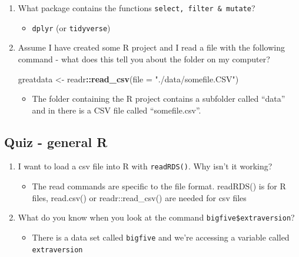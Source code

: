 \documentclass[
]{book}
\newenvironment{Shaded}{\begin{snugshade}}{\end{snugshade}}
\newcommand{\AttributeTok}[1]{\textcolor[rgb]{0.13,0.29,0.53}{#1}}
\newcommand{\FunctionTok}[1]{\textcolor[rgb]{0.13,0.29,0.53}{\textbf{#1}}}
\newcommand{\NormalTok}[1]{#1}
\newcommand{\OtherTok}[1]{\textcolor[rgb]{0.56,0.35,0.01}{#1}}
\newcommand{\SpecialCharTok}[1]{\textcolor[rgb]{0.81,0.36,0.00}{\textbf{#1}}}
\newcommand{\StringTok}[1]{\textcolor[rgb]{0.31,0.60,0.02}{#1}}
\providecommand{\tightlist}{%
  \setlength{\itemsep}{0pt}\setlength{\parskip}{0pt}}
\begin{document}
\begin{enumerate}
\def\labelenumi{\arabic{enumi}.}
\item
  What package contains the functions \texttt{select,\ filter\ \&\ mutate}?

  \begin{itemize}
  \tightlist
  \item
    \texttt{dplyr} (or \texttt{tidyverse})
  \end{itemize}
\item
  Assume I have created some R project and I read a file with the following command - what does this tell you about the folder on my computer?

\begin{Shaded}
\begin{Highlighting}[]
\NormalTok{greatdata }\OtherTok{\textless{}{-}}\NormalTok{ readr}\SpecialCharTok{::}\FunctionTok{read\_csv}\NormalTok{(}\AttributeTok{file =} \StringTok{"./data/somefile.CSV"}\NormalTok{)}
\end{Highlighting}
\end{Shaded}

  \begin{itemize}
  \tightlist
  \item
    The folder containing the R project contains a subfolder called ``data'' and in there is a CSV file called ``somefile.csv''.
  \end{itemize}
\end{enumerate}

\subsection{Quiz - general R}\label{quiz---general-r-1}

\begin{enumerate}
\def\labelenumi{\arabic{enumi}.}
\setcounter{enumi}{2}
\tightlist
\item
  I want to load a csv file into R with \texttt{readRDS()}. Why isn't it working?

  \begin{itemize}
  \tightlist
  \item
    The read commands are specific to the file format. readRDS() is for R files, read.csv() or readr::read\_csv() are needed for csv files
  \end{itemize}
\item
  What do you know when you look at the command \texttt{bigfive\$extraversion}?

  \begin{itemize}
  \tightlist
  \item
    There is a data set called \texttt{bigfive} and we're accessing a variable called \texttt{extraversion}
  \end{itemize}
\end{enumerate}
\end{document}
